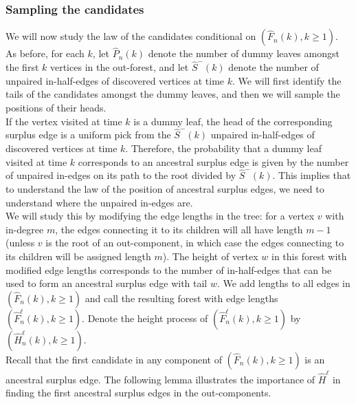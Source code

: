 \subsubsection{Sampling the candidates}\label{subsubsec.samplecandidates}
We will now study the law of the candidates conditional on $(\hat{F}_n(k),k\geq 1)$. As before, for each $k$, let $\hat{P}_n(k)$ denote the number of dummy leaves amongst the first $k$ vertices in the out-forest, and let $\hat{S}^-(k)$ denote the number of unpaired in-half-edges of discovered vertices at time $k$. We will first identify the tails of the candidates amongst the dummy leaves, and then we will sample the positions of their heads. \\
If the vertex visited at time $k$ is a dummy leaf, the head of the corresponding surplus edge is a uniform pick from the $\hat{S}^-(k)$ unpaired in-half-edges of discovered vertices at time $k$. Therefore, the probability that a dummy leaf visited at time $k$ corresponds to an ancestral surplus edge is given by the number of unpaired in-edges on its path to the root divided by $\hat{S}^-(k)$. This implies that to understand the law of the position of ancestral surplus edges, we need to understand where the unpaired in-edges are. \\
We will study this by modifying the edge lengths in the tree: for a vertex $v$ with in-degree $m$, the edges connecting it to its children will all have length $m-1$ (unless $v$ is the root of an out-component, in which case the edges connecting to its children will be assigned length $m$). The height of vertex $w$ in this forest with modified edge lengths corresponds to the number of in-half-edges that can be used to form an ancestral surplus edge with tail $w$. We add lengths to all edges in $(\hat{F}_n(k),k\geq 1)$ and call the resulting forest with edge lengths $(\hat{F}^\ell_n(k),k\geq 1)$. Denote the height process of $(\hat{F}^\ell_n(k),k\geq 1)$ by $(\hat{H}_n^\ell(k),k\geq 1)$. \\
Recall that the first candidate in any component of $(\hat{F}_n(k),k\geq 1)$ is an ancestral surplus edge. The following lemma illustrates the importance of $\hat{H}^\ell$ in finding the first ancestral surplus edges in the out-components.

